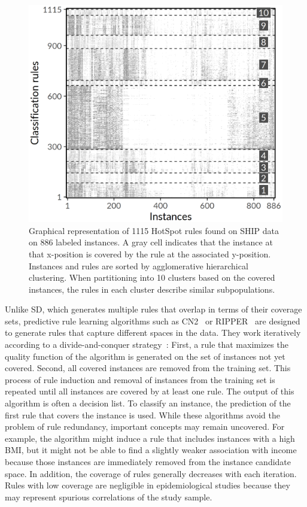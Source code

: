 \documentclass[
  oneside]{book}
\begin{document}
\begin{figure}[h]

{\centering \includegraphics[width=0.6\linewidth]{figures/04-rule-overlap-heatmap} 

}

\caption{Graphical representation of 1115 HotSpot rules found on SHIP data on 886 labeled instances. A gray cell indicates that the instance at that x-position is covered by the rule at the associated y-position. Instances and rules are sorted by agglomerative hierarchical clustering. When partitioning into 10 clusters based on the covered instances, the rules in each cluster describe similar subpopulations.}\label{fig:04-rule-overlap-heatmap}
\end{figure}

Unlike SD, which generates multiple rules that overlap in terms of their coverage sets, predictive rule learning algorithms such as CN2~\autocite{Clark:CN289} or RIPPER~\autocite{Cohen:RIPPER95} are designed to generate rules that capture different spaces in the data.
They work iteratively according to a divide-and-conquer strategy~\autocite{Fuernkranz:12}:
First, a rule that maximizes the quality function of the algorithm is generated on the set of instances not yet covered.
Second, all covered instances are removed from the training set.
This process of rule induction and removal of instances from the training set is repeated until all instances are covered by at least one rule.
The output of this algorithm is often a decision list.
To classify an instance, the prediction of the first rule that covers the instance is used.
While these algorithms avoid the problem of rule redundancy, important concepts may remain uncovered.
For example, the algorithm might induce a rule that includes instances with a high BMI, but it might not be able to find a slightly weaker association with income because those instances are immediately removed from the instance candidate space.
In addition, the coverage of rules generally decreases with each iteration.
Rules with low coverage are negligible in epidemiological studies because they may represent spurious correlations of the study sample.
\end{document}
